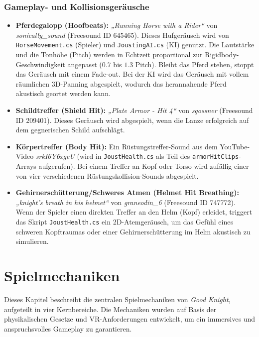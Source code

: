 \documentclass[11pt, a4paper]{article}
\begin{document}
\subsubsection{Gameplay- und Kollisionsgeräusche}
\begin{itemize}
    \item \textbf{Pferdegalopp (Hoofbeats):} \textit{„Running Horse with a Rider“} von \textit{sonically\_sound} (Freesound ID 645465). Dieses Hufgeräusch wird von \texttt{HorseMovement.cs} (Spieler) und \texttt{JoustingAI.cs} (KI) genutzt. Die Lautstärke und die Tonhöhe (Pitch) werden in Echtzeit proportional zur Rigidbody-Geschwindigkeit angepasst ($0.7$ bis $1.3$ Pitch). Bleibt das Pferd stehen, stoppt das Geräusch mit einem Fade-out. Bei der KI wird das Geräusch mit vollem räumlichen 3D-Panning abgespielt, wodurch das herannahende Pferd akustisch geortet werden kann.
    
    \item \textbf{Schildtreffer (Shield Hit):} \textit{„Plate Armor - Hit 4“} von \textit{sgossner} (Freesound ID 209401). Dieses Geräusch wird abgespielt, wenn die Lanze erfolgreich auf dem gegnerischen Schild aufschlägt.
    
    \item \textbf{Körpertreffer (Body Hit):} Ein Rüstungstreffer-Sound aus dem YouTube-Video \textit{srkI6Y6xgeU} (wird in \texttt{JoustHealth.cs} als Teil des \texttt{armorHitClips}-Arrays aufgerufen). Bei einem Treffer an Kopf oder Torso wird zufällig einer von vier verschiedenen Rüstungskollision-Sounds abgespielt.
    
    \item \textbf{Gehirnerschütterung/Schweres Atmen (Helmet Hit Breathing):} \textit{„knight's breath in his helmet“} von \textit{graneodin\_6} (Freesound ID 747772). Wenn der Spieler einen direkten Treffer an den Helm (Kopf) erleidet, triggert das Skript \texttt{JoustHealth.cs} ein 2D-Atemgeräusch, um das Gefühl eines schweren Kopftraumas oder einer Gehirnerschütterung im Helm akustisch zu simulieren.
\end{itemize}

\newpage
\section{Spielmechaniken}
Dieses Kapitel beschreibt die zentralen Spielmechaniken von \textit{Good Knight}, aufgeteilt in vier Kernbereiche. Die Mechaniken wurden auf Basis der physikalischen Gesetze und VR-Anforderungen entwickelt, um ein immersives und anspruchsvolles Gameplay zu garantieren.
\end{document}
